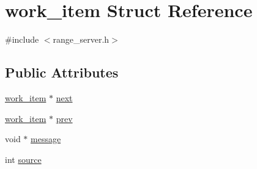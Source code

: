 \hypertarget{structwork__item}{\section{work\-\_\-item Struct Reference}
\label{d1/dc4/structwork__item}
}


{\ttfamily \#include $<$range\-\_\-server.\-h$>$}

\subsection*{Public Attributes}
\begin{DoxyCompactItemize}
\item 
\hyperlink{structwork__item}{work\-\_\-item} $\ast$ \hyperlink{structwork__item_a63063b910e219526f27dcd391ed4af38}{next}
\item 
\hyperlink{structwork__item}{work\-\_\-item} $\ast$ \hyperlink{structwork__item_adf400e3104c2071b1f192d48690408b4}{prev}
\item 
void $\ast$ \hyperlink{structwork__item_a2c6449b530233592562d05debbab126f}{message}
\item 
int \hyperlink{structwork__item_aafb1f7c16f606a3fd5a9ee24d3a34a42}{source}
\end{DoxyCompactItemize}



